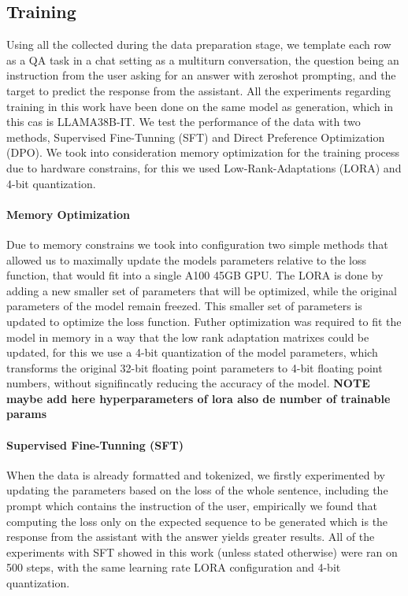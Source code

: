 \documentclass[a4paper,10pt]{article}
\begin{document}
\subsection{Training}
Using all the collected during the data preparation stage, we template each row as a QA task in a chat setting as a multiturn conversation, the question being an instruction from the user asking for an answer with zeroshot prompting, and the target to predict the response from the assistant. All the experiments regarding training in this work have been done on the same model as generation, which in this cas is LLAMA38B-IT. We test the performance of the data with two methods, Supervised Fine-Tunning (SFT) and Direct Preference Optimization (DPO). We took into consideration memory optimization for the training process due to hardware constrains, for this we used Low-Rank-Adaptations (LORA) and 4-bit quantization.
\paragraph {Memory Optimization}
Due to memory constrains we took into configuration two simple methods that allowed us to maximally update the models parameters relative to the loss function, that would fit into a single A100 45GB GPU. The LORA is done by adding a new smaller set of parameters that will be optimized, while the original parameters of the model remain freezed. This smaller set of parameters is updated to optimize the loss function. Futher optimization was required to fit the model in memory in a way that the low rank adaptation matrixes could be updated, for this we use a 4-bit quantization of the model parameters, which transforms the original 32-bit floating point parameters to 4-bit floating point numbers, without signifincatly reducing the accuracy of the model. \textbf{NOTE maybe add here hyperparameters of lora also de number of trainable params}
\paragraph{Supervised Fine-Tunning (SFT)}
When the data is already formatted and tokenized, we firstly experimented by updating the parameters based on the loss of the whole sentence, including the prompt which contains the instruction of the user, empirically we found that computing the loss only on the expected sequence to be generated which is the response from the assistant with the answer yields greater results. All of the experiments with SFT showed in this work (unless stated otherwise) were ran on 500 steps, with the same learning rate LORA configuration and 4-bit quantization.
\end{document}
